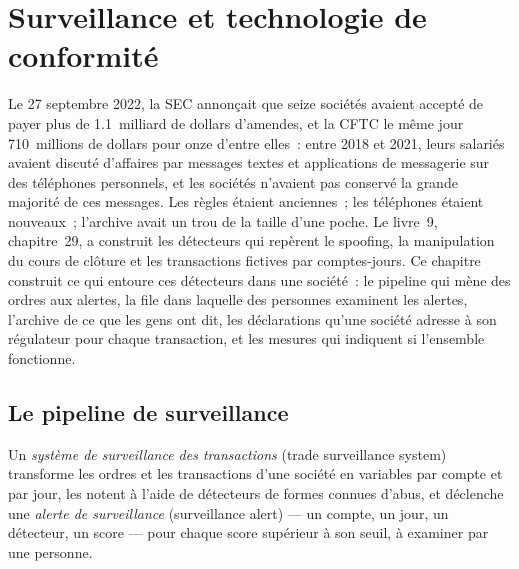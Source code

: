 \chapter{Surveillance et technologie de conformité}\label{ch:pl:surveillance-and-compliance-technology}

Le 27 septembre 2022, la SEC annonçait que seize sociétés avaient accepté de payer plus de 1.1~milliard de dollars d'amendes, et la CFTC le même jour
710~millions de dollars pour onze d'entre elles~: entre 2018 et 2021, leurs salariés avaient discuté d'affaires par messages textes et applications de messagerie sur des
téléphones personnels, et les sociétés n'avaient pas conservé la grande majorité de ces messages. Les règles étaient anciennes~; les téléphones étaient nouveaux~; l'archive avait un
trou de la taille d'une poche. Le livre~9, chapitre~29, a construit les détecteurs qui repèrent le spoofing, la manipulation du cours de clôture et les transactions fictives par comptes-jours. Ce
chapitre construit ce qui entoure ces détecteurs dans une société~: le pipeline qui mène des ordres aux alertes, la file dans laquelle des personnes examinent les alertes, l'archive de ce que
les gens ont dit, les déclarations qu'une société adresse à son régulateur pour chaque transaction, et les mesures qui indiquent si l'ensemble fonctionne.

\section{Le pipeline de surveillance}

\begin{definition}\label{def:pl:surveillance-and-compliance-technology:system}
Un \emph{système de surveillance des transactions} (trade surveillance system) transforme les ordres et les transactions d'une société en variables par compte et par jour, les notent
à l'aide de détecteurs de formes connues d'abus, et déclenche une \emph{alerte de surveillance} (surveillance alert) --- un compte, un jour, un
détecteur, un score --- pour chaque score supérieur à son seuil, à examiner par une personne.
\end{definition}

